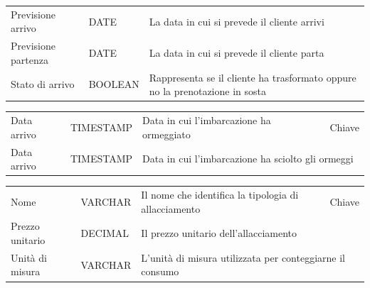 \begin{center}
    \begin{tabularx}{\textwidth}{|l|l|X|}
        \hline
        \rowcolor{gray!30}
        \multicolumn{3}{|c|}{\textbf{Prenotazione}}\\
        \hline
        Previsione arrivo & DATE & La data in cui si prevede il cliente arrivi\\
        \hline
        Previsione partenza & DATE & La data in cui si prevede il cliente parta\\
        \hline
        Stato di arrivo & BOOLEAN & Rappresenta se il cliente ha trasformato oppure no la prenotazione in sosta\\
        \hline
    \end{tabularx}
\end{center}

\begin{center}
    \begin{tabularx}{\textwidth}{|l|l|l|X|}
        \hline
        \rowcolor{gray!30}
        \multicolumn{4}{|c|}{\textbf{Sosta}}\\
        \hline
        Data arrivo & TIMESTAMP & Data in cui l'imbarcazione ha ormeggiato & Chiave \\
        \hline
        Data arrivo & TIMESTAMP & \multicolumn{2}{l|}{Data in cui l'imbarcazione ha sciolto gli ormeggi} \\
        \hline
    \end{tabularx}
\end{center}

\begin{center}
    \begin{tabularx}{\textwidth}{|l|l|l|X|}
        \hline
        \rowcolor{gray!30}
        \multicolumn{4}{|c|}{\textbf{Allacciamento}}\\
        \hline
        Nome & VARCHAR & Il nome che identifica la tipologia di allacciamento &Chiave\\
        \hline
        Prezzo unitario & DECIMAL & \multicolumn{2}{l|}{Il prezzo unitario dell'allacciamento}\\
        \hline
        Unità di misura & VARCHAR & \multicolumn{2}{l|}{L'unità di misura utilizzata per conteggiarne il consumo}\\
        \hline
    \end{tabularx}
\end{center}

